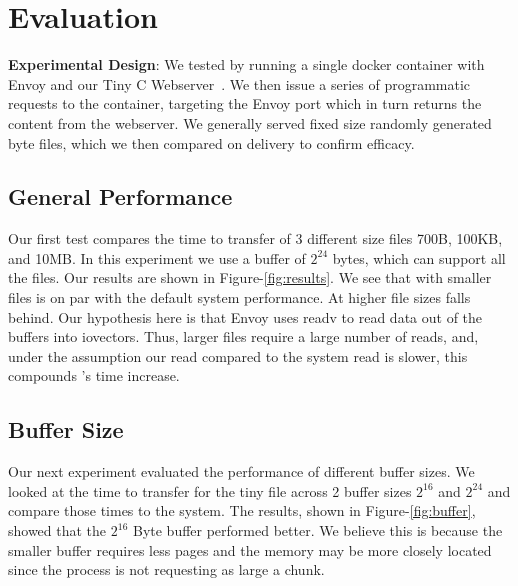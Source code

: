 \section{Evaluation}
\label{sec:evaluation}
\textbf{Experimental Design}:
We tested \sysname by running a single docker container with Envoy and our Tiny C Webserver~\cite{tiny}.
We then issue a series of programmatic requests to the container, targeting the Envoy port which in turn returns the content from the webserver.
We generally served fixed size randomly generated byte files, which we then compared on delivery to confirm efficacy.

\subsection{General Performance}
Our first test compares the time to transfer of 3 different size files 700B, 100KB, and 10MB.
In this experiment we use a buffer of $2^{24}$ bytes, which can support all the files.
Our results are shown in Figure-\ref{fig:results}.
We see that with smaller files \sysname is on par with the default system performance.
At higher file sizes \sysname falls behind.
Our hypothesis here is that Envoy uses readv to read data out of the buffers into iovectors.
Thus, larger files require a large number of reads, and, under the assumption our read compared to the system read is slower, this compounds \sysname's time increase.

\subsection{Buffer Size}
Our next experiment evaluated the performance of different buffer sizes.
We looked at the time to transfer for the tiny file across 2 buffer sizes $2^{16}$ and $2^{24}$ and compare those times to the system.
The results, shown in Figure-\ref{fig:buffer}, showed that the $2^{16}$ Byte buffer performed better.
We believe this is because the smaller buffer requires less pages and the memory may be more closely located since the process is not requesting as large a chunk.

